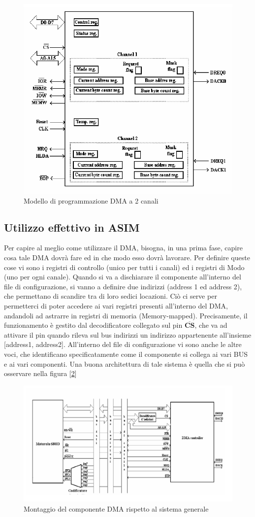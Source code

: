 \begin{figure}
    \centering
    \includegraphics[width=.7\textwidth]{img/DMA.png}
    \caption{Modello di programmazione DMA a 2 canali}\label{img:DMA}
\end{figure}

\subsection{Utilizzo effettivo in ASIM}
Per capire al meglio come utilizzare il DMA, bisogna, in una prima fase, capire cosa tale DMA dovrà fare ed in che modo esso dovrà lavorare. Per definire queste cose vi sono i registri di controllo (unico per tutti i canali) ed i registri di Modo (uno per ogni canale). Quando si va a dischiarare il componente all'interno del file di configurazione, si vanno a definire due indirizzi (address 1 ed address 2), che permettano di scandire tra di loro sedici locazioni. Ciò ci serve per permetterci di poter accedere ai vari registri presenti all'interno del DMA, andandoli ad astrarre in registri di memoria (Memory-mapped). Precisamente, il funzionamento è gestito dal decodificatore collegato sul pin $\overline{\mathbf{CS}}$, che va ad attivare il pin quando rileva sul bus indirizzi un indirizzo appartenente all'insieme [address1, address2]. All'interno del file di configurazione vi sono anche le altre voci, che identificano specificatamente come il componente si collega ai vari BUS e ai vari componenti. Una buona architettura di tale sistema è quella che si può osservare nella figura [\ref{img:architettura-dma}]

\begin{figure}[h!]
    \centering
    \includegraphics[width=.7\textwidth]{img/architettura-dma.png}
    \caption{Montaggio del componente DMA rispetto al sistema generale}\label{img:architettura-dma}
\end{figure}

